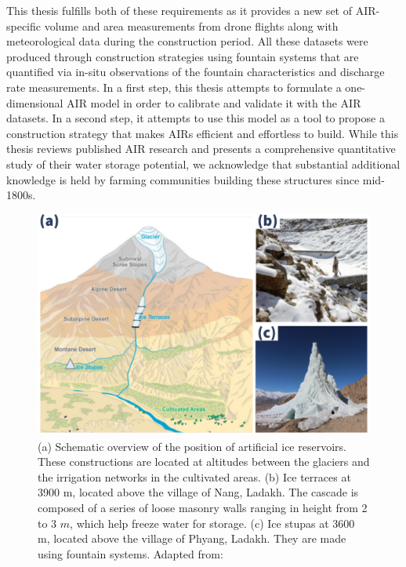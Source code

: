 This thesis fulfills both of these requirements as it provides a new set of AIR-specific volume and area
measurements from drone flights along with meteorological data during the construction period. All these
datasets were produced through construction strategies using fountain systems that are quantified via in-situ
observations of the fountain characteristics and discharge rate measurements. In a first step, this thesis
attempts to formulate a one-dimensional AIR model in order to calibrate and validate it with the AIR datasets.
In a second step, it attempts to use this model as a tool to propose a construction strategy that makes AIRs
efficient and effortless to build. While this thesis reviews published AIR research and presents a comprehensive
quantitative study of their water storage potential, we acknowledge that substantial additional knowledge is
held by farming communities building these structures since mid-1800s.

\begin{figure}[t]
\centering
\includegraphics[width=12cm]{figs/AIR_forms.jpg}

\caption{(a) Schematic overview of the position of artificial ice reservoirs. These constructions are located at
  altitudes between the glaciers and the irrigation networks in the cultivated areas. (b) Ice terraces at 3900
  m, located above the village of Nang, Ladakh. The cascade is composed of a series of loose masonry walls
  ranging in height from 2 to 3 $m$, which help freeze water for storage. (c) Ice stupas at 3600 m, located
above the village of Phyang, Ladakh. They are made using fountain systems. Adapted from:
\cite{nusserLocalKnowledgeGlobal2016}}

\label{fig:AIRforms}
\end{figure}

